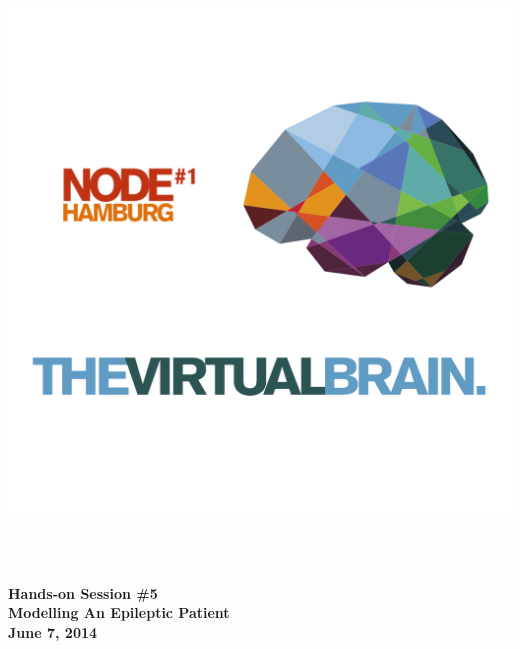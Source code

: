 \thispagestyle{plain}
\begin{titlepage}
\begin{center}
\includegraphics[width=1.5\textwidth]{./tvb_logo_transparent_square.png}~\\[0.5cm]

\begin{fullwidth}
\HRule \\[0.2cm]
\begin{center}
{ \huge \bfseries Hands-on Session \#5 \\ [0.2cm] Modelling An Epileptic Patient \\[0.1cm] }
{ \large \bfseries June 7, 2014 \\[0.2cm]}
\end{center}
\HRule \\[0.2cm]
\end{fullwidth}

\end{center}
\end{titlepage}
